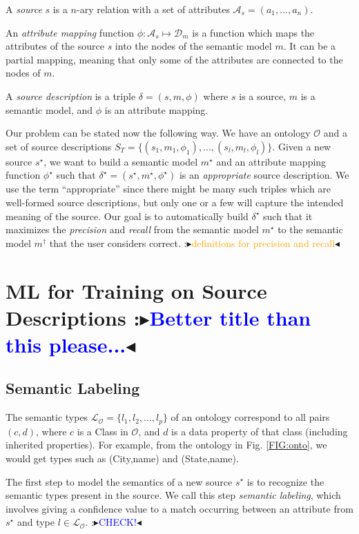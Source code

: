 \documentclass[letterpaper]{article} %
\newcommand{\authornote}[3]{
  {\fbox{\sc 
  #1}:$\blacktriangleright$\textcolor{#2}{\small{#3}}$\blacktriangleleft$}%
}
\newcommand{\ddg}[1]{\authornote{DDG}{blue}{#1}}
\newcommand{\npr}[1]{\authornote{NPR}{orange}{#1}}
\begin{document}
A \emph{source} $s$ is a $n$-ary relation with a set of attributes 
$\mathcal{A}_s = (a_1,...,a_n)$.

An \emph{attribute mapping} function $\phi : \mathcal{A}_s \mapsto 
\mathcal{D}_m$ is a function which maps the attributes of the source $s$ into the nodes of the semantic model $m$. 
It can be a partial mapping, meaning that only some of the attributes
are connected to the nodes of $m$.

A \emph{source description} is a triple $\delta = (s, m, \phi)$ where $s$ is a source, $m$ is a semantic model, and $\phi$ is an attribute mapping.

Our problem can be stated now the following way. We have an ontology 
$\mathcal{O}$ and a set of source descriptions $S_T = \{(s_1, m_1, \phi_1),..., 
(s_l, m_l, \phi_l)\}$.
Given a new source $s^\star$, we want to build a semantic model $m^\star$ and an attribute mapping function $\phi^\star$ such that 
$\delta^\star = (s^\star,m^\star,\phi^\star)$ is an \emph{appropriate} source 
description. We
use the term ``appropriate'' since there might be many such triples which are
well-formed source descriptions, but only one or a few will capture the intended
meaning of the source. 
Our goal is to automatically build $\delta^\star$ such that it maximizes the \emph{precision} and \emph{recall} from the semantic model 
$m^\star$ to the semantic model $m^\dag$ that the user considers correct. \npr{definitions for precision and recall}


\section{ML for Training on Source Descriptions \label{SEC:ML}\ddg{Better title 
than this 
please...}}


\subsection{Semantic Labeling}
The semantic types $\mathcal{L_O} = \{l_1, l_2, ..., l_p\}$ of an ontology 
correspond to all pairs $(c,d)$, where $c$ is a Class in $\mathcal{O}$, and $d$ 
is a data property of that class (including inherited properties). 
For example, from the ontology in Fig. \ref{FIG:onto}, we would get types such 
as 
(City,name) and (State,name).

The first step to model the semantics of a new source $s^\star$ is to recognize the semantic types present in the source. 
We call this step \emph{semantic labeling}, which involves giving a confidence value to a match occurring between an attribute from $s^\star$ and type $l \in 
\mathcal{L_O}$. \ddg{CHECK!}
\end{document}

